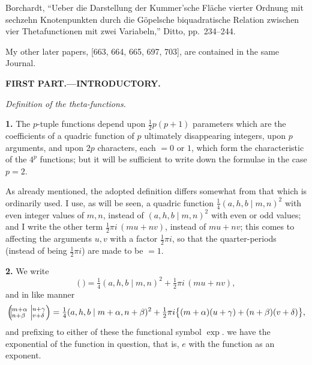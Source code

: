 \documentclass[11pt]{article}
\begin{document}
\medskip

Borchardt, ``Ueber die Darstellung der Kummer'sche Fl\"ache vierter Ordnung mit sechzehn Knotenpunkten durch die G\"opelsche biquadratische Relation zwischen vier Thetafunctionen mit zwei Variabeln,'' Ditto, pp.\ 234--244.

\medskip

My other later papers, [663, 664, 665, 697, 703], are contained in the same Journal.

\bigskip

\begin{center}\textbf{FIRST PART.---INTRODUCTORY.}\end{center}

\medskip

\textit{Definition of the theta-functions.}

\medskip

\textbf{1.} The $p$-tuple functions depend upon $\tfrac{1}{2}p(p+1)$ parameters which are the coefficients of a quadric function of $p$ ultimately disappearing integers, upon $p$ arguments, and upon $2p$ characters, each $=0$ or $1$, which form the characteristic of the $4^p$ functions; but it will be sufficient to write down the formulae in the case $p = 2$.

As already mentioned, the adopted definition differs somewhat from that which is ordinarily used. I use, as will be seen, a quadric function $\tfrac{1}{4}(a,h,b\mid m,n)^2$ with even integer values of $m,n$, instead of $(a,h,b\mid m,n)^2$ with even or odd values; and I write the other term $\tfrac{1}{2}\pi i\,(mu + nv)$, instead of $mu + nv$; this comes to affecting the arguments $u,v$ with a factor $\tfrac{1}{2}\pi i$, so that the quarter-periods (instead of being $\tfrac{1}{2}\pi i$) are made to be $= 1$.

\medskip

\textbf{2.} We write
\[
\bigl(\ \bigr) = \tfrac{1}{4}(a,h,b\mid m,n)^2 + \tfrac{1}{2}\pi i\,(mu + nv),
\]
and in like manner
\[
\Bigl(\!\!\bigm|\!\!^{m+\alpha}_{n+\beta}\Bigm|\!\!^{u+\gamma}_{v+\delta}\Bigr) = \tfrac{1}{4}(a,h,b \mid m + \alpha, n + \beta)^2 + \tfrac{1}{2}\pi i\bigl\{(m + \alpha)(u + \gamma) + (n + \beta)(v + \delta)\bigr\},
\]
and prefixing to either of these the functional symbol $\exp.$ we have the exponential of the function in question, that is, $e$ with the function as an exponent.
\end{document}
